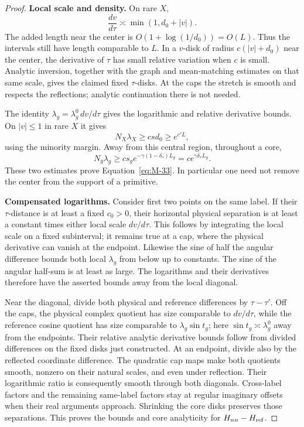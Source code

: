 \begin{proof}
\par\smallskip\noindent\textbf{Local scale and density.}
On rare $X$,
\[
 \frac{dv}{d\tau}\asymp\min(1,d_0+|v|).
\]
The added length near the center is
$O(1+\log(1/d_0))=O(L)$. Thus the intervals still have length
comparable to $L$. In a $v$-disk of radius $c(|v|+d_0)$ near the
center, the derivative of $\tau$ has small relative variation when
$c$ is small. Analytic inversion, together with the graph and
mean-matching estimates on that same scale, gives the claimed fixed
$\tau$-disks. At the caps the stretch is smooth and respects the
reflections; analytic continuation there is not needed.

The identity $\lambda_g=\lambda_g^0\,dv/d\tau$ gives the logarithmic
and relative derivative bounds. On $|v|\le1$ in rare $X$ it gives
\[
 N_X\lambda_X\ge c s d_0\ge e^{c'L},
\]
using the minority margin. Away from this central region, throughout
a core,
\[
 N_g\lambda_g\ge c s_g e^{-\gamma(1-\delta_*)L_g}
       =c e^{\gamma\delta_*L_g}.
\]
These two estimates prove Equation~\eqref{eq:M-33}. In particular
one need not remove the center from the support of a primitive.

\par\smallskip\noindent\textbf{Compensated logarithms.}
Consider first two points on the same label. If their $\tau$-distance
is at least a fixed $c_0>0$, their horizontal physical separation is
at least a constant times either local scale $dv/d\tau$. This follows
by integrating the local scale on a fixed subinterval; it remains true
at a cap, where the physical derivative can vanish at the endpoint.
Likewise the sine of half the angular difference bounds both local
$\lambda_g$ from below up to constants. The sine of the angular
half-sum is at least as large. The logarithms and their derivatives
therefore have the asserted bounds away from the local diagonal.

Near the diagonal, divide both physical and reference differences by
$\tau-\tau'$. Off the caps, the physical complex quotient has size
comparable to $dv/d\tau$, while the reference cosine quotient has
size comparable to $\lambda_g\sin t_g$; here
$\sin t_g\asymp\lambda_g^0$ away from the endpoints. Their relative
analytic derivative bounds follow from divided differences on the
fixed disks just constructed. At an endpoint, divide also by the
reflected coordinate difference. The quadratic cap maps make both
quotients smooth, nonzero on their natural scales, and even under
reflection. Their logarithmic ratio is consequently smooth through
both diagonals. Cross-label factors and the remaining same-label
factors stay at regular imaginary offsets when their real arguments
approach. Shrinking the core disks preserves those separations.
This proves the bounds and core analyticity for
$H_{nn}-H_{\rm ref}$.


\end{proof}
